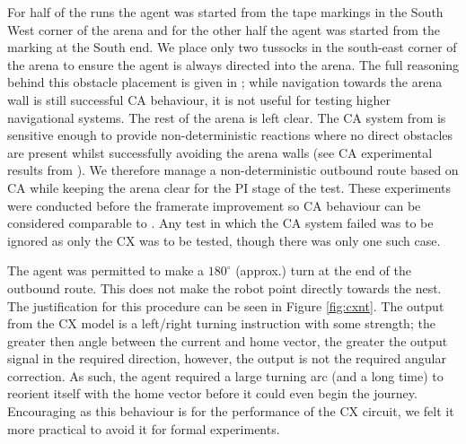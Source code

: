 \documentclass[a4paper,11pt,twoside,openright]{article}
\begin{document}
For half of the runs the agent was started from the tape markings in
the South West corner of the arena and for the other half the agent
was started from the marking at the South end.  We place only two
tussocks in the south-east corner of the arena to ensure the agent is
always directed into the arena. The full reasoning behind this
obstacle placement is given in \cite{Mitchell2018}; while navigation
towards the arena wall is still successful CA behaviour, it is not
useful for testing higher navigational systems. The rest of the arena
is left clear. The CA system from \cite{Mitchell2018} is sensitive
enough to provide non-deterministic reactions where no direct
obstacles are present whilst successfully avoiding the arena walls
(see CA experimental results from \cite{Mitchell2018}). We therefore
manage a non-deterministic outbound route based on CA while keeping
the arena clear for the PI stage of the test. These experiments were
conducted before the framerate improvement so CA behaviour can be
considered comparable to \cite{Mitchell2018}. Any test in which the CA
system failed was to be ignored as only the CX was to be tested,
though there was only one such case.
\newline\par

The agent was permitted to make a $180^{\circ}$ (approx.) turn at the
end of the outbound route. This does not make the robot point directly towards
the nest. The justification for this procedure can be seen in Figure
\ref{fig:cxnt}. The output from the CX model is a left/right turning instruction
with some strength; the greater then angle between the current and home vector,
the greater the output signal in the required direction, however, the output is
not the required angular correction. As such, the agent required a large turning
arc (and a long time) to reorient itself with the home vector before it could
even begin the journey. Encouraging as this behaviour is for the performance of
the CX circuit, we felt it more practical to avoid it for formal experiments.
\newline\par
\end{document}
